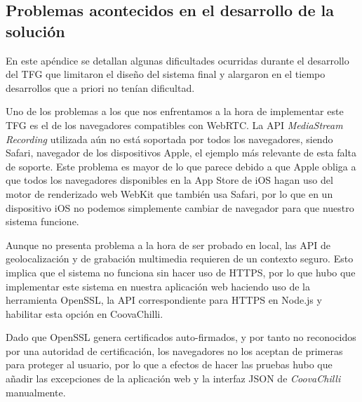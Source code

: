 \begin{appendices}
\cleardoublepage
{}%
\begin{center}
\begin{minipage}{.75\textwidth}
\section{Problemas acontecidos en el desarrollo de la solución}\label{ApendiceE}

En este apéndice se detallan algunas dificultades ocurridas durante el desarrollo del TFG que limitaron el diseño del sistema final y alargaron en el tiempo desarrollos que a priori no tenían dificultad.
\end{minipage}
\end{center}
\clearpage%

Uno de los problemas a los que nos enfrentamos a la hora de implementar este TFG es el de los navegadores compatibles con WebRTC. La API \emph{MediaStream Recording} utilizada aún no está soportada por todos los navegadores, siendo Safari, navegador de los dispositivos Apple, el ejemplo más relevante de esta falta de soporte. Este problema es mayor de lo que parece debido a que Apple obliga a que todos los navegadores disponibles en la App Store de iOS hagan uso del motor de renderizado web WebKit que también usa Safari, por lo que en un dispositivo iOS no podemos simplemente cambiar de navegador para que nuestro sistema funcione.

Aunque no presenta problema a la hora de ser probado en local, las API de geolocalización y de grabación multimedia requieren de un contexto seguro. Esto implica que el sistema no funciona sin hacer uso de HTTPS, por lo que hubo que implementar este sistema en nuestra aplicación web haciendo uso de la herramienta OpenSSL, la API correspondiente para \acrshort{HTTPS} en Node.js y habilitar esta opción en CoovaChilli.

Dado que OpenSSL genera certificados auto-firmados, y por tanto no reconocidos por una autoridad de certificación, los navegadores no los aceptan de primeras para proteger al usuario, por lo que a efectos de hacer las pruebas hubo que añadir las excepciones de la aplicación web y la interfaz JSON de \emph{CoovaChilli} manualmente.


\end{appendices}
